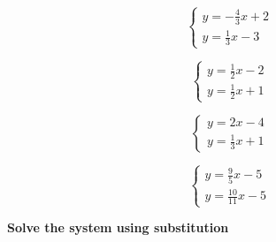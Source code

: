 \documentclass[11pt]{article}
\begin{document}
\begin{multicols}{2}

\begin{equation*}
	\begin{cases}
		y=-\frac{4}{3}x+2\\
		y=\frac{1}{3}x-3	
	\end{cases}
\end{equation*}

	
\begin{center}
\end{center}

\begin{equation*}
	\begin{cases}
		y=\frac{1}{2}x-2\\
		y=\frac{1}{2}x+1	
	\end{cases}
\end{equation*}

	
\begin{center}
\end{center}

\begin{equation*}
	\begin{cases}
		y=2x-4\\
		y=\frac{1}{3}x+1	
	\end{cases}
\end{equation*}

	
\begin{center}
\end{center}

\begin{equation*}
	\begin{cases}
		y=\frac{9}{5}x-5\\
		
		y=\frac{10}{11}x-5	
	\end{cases}
\end{equation*}

	
\begin{center}
\end{center}

\end{multicols}

\pagebreak

\hrulefill

\textbf{Solve the system using substitution}\\
\end{document}
